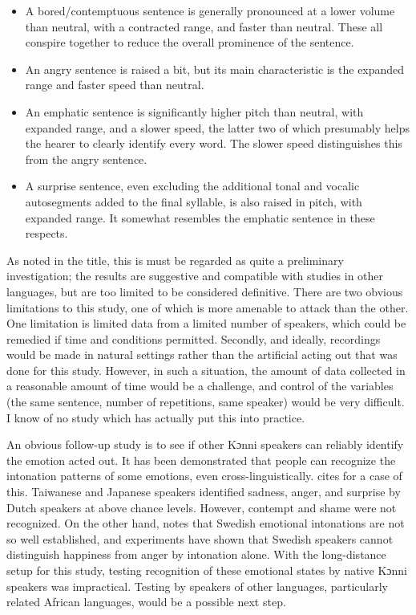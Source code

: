 \documentclass[output=paper]{langsci/langscibook}
\begin{document}
\begin{itemize}[noitemsep]
\item A bored/contemptuous sentence is generally pronounced at a lower volume than neutral, with a contracted range, and faster than neutral. These all conspire together to reduce the overall prominence of the sentence.
\item An angry sentence is raised a bit, but its main characteristic is the expanded range and faster speed than neutral.
\item An emphatic sentence is significantly higher pitch than neutral, with expanded range, and a slower speed, the latter two of which presumably helps the hearer to clearly identify every word. The slower speed distinguishes this from the angry sentence.
\item A surprise sentence, even excluding the additional tonal and vocalic autosegments added to the final syllable, is also raised in pitch, with expanded range. It somewhat resembles the emphatic sentence in these respects. 
\end{itemize}

As noted in the title, this is must be regarded as quite a preliminary investigation; the results are suggestive and compatible with studies in other languages, but are too limited to be considered definitive. There are two obvious limitations to this study, one of which is more amenable to attack than the other. One limitation is limited data from a limited number of speakers, which could be remedied if time and conditions permitted. Secondly, and ideally, recordings would be made in natural settings rather than the artificial acting out that was done for this study. However, in such a situation, the amount of data collected in a reasonable amount of time would be a challenge, and control of the variables (the same sentence, number of repetitions, same speaker) would be very difficult. I know of no study which has actually put this into practice.

An obvious follow-up study is to see if other Kɔnni speakers can reliably identify the emotion acted out. It has been demonstrated that people can recognize the intonation patterns of some emotions, even cross-linguistically. \citet[72]{gussenhoven2004} cites \citet[128]{vanbezooijen1984} for a case of this. Taiwanese and Japanese speakers identified sadness, anger, and surprise by Dutch speakers at above chance levels. However, contempt and shame were not recognized. On the other hand, \citet[12]{garding1998} notes that Swedish emotional intonations are not so well established, and experiments have shown that Swedish speakers cannot distinguish happiness from anger by intonation alone. With the long-distance setup for this study, testing recognition of these emotional states by native Kɔnni speakers was impractical. Testing by speakers of other languages, particularly related African languages, would be a possible next step.
\end{document}
